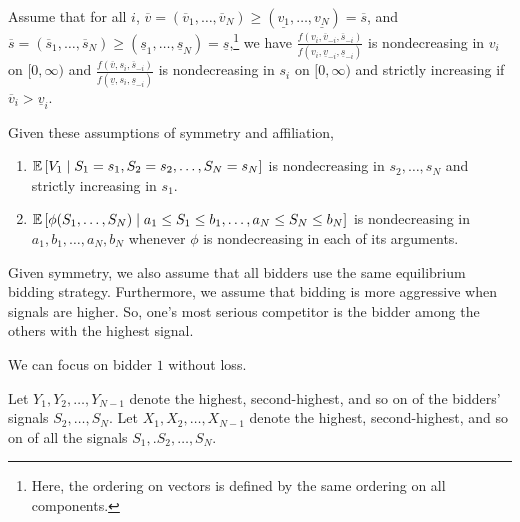 \begin{assumption}[Affiliation]
	Assume that for all $i$, $\overline{v} = \left( \overline{v}_1,\ldots,\overline{v}_N \right) \ge \left( \underline{v_1},\ldots,\underline{v_N} \right) = \overline{s}$, and $\overline{s} = \left( \overline{s}_1,\ldots,\overline{s}_N \right) \ge \left( \underline{s}_1,\ldots,\underline{s}_N \right) = \underline{s}$,\footnote{Here, the ordering on vectors is defined by the same ordering on all components.} we have $
	\frac{f\left( v_i, \overline{v}_{-i}, \overline{s}_{-i} \right)}{f\left( v_i, \underline{v}_{-i}, \underline{s}_{-i} \right)}$ is nondecreasing in $v_i$ on $[0,\infty)$ and $\frac{f(\overline{v}, s_i, \overline{s}_{-i})}{f(\underline{v}, s_{i}, \underline{s}_{-i})}$ is nondecreasing in $s_i$ on $[0,\infty)$ and strictly increasing if $\overline{v}_i > \underline{v}_i$.
\end{assumption}

\begin{proposition}	Given these assumptions of symmetry and affiliation,
		\begin{enumerate}[label=(\roman*)]
			\item $\mathbb{E}\left[V_1 \mid S_1=s_1,S_2= s_2, \ldots,S_N = s_N\right] $ is nondecreasing in $s_2,\ldots,s_N$ and strictly increasing in $s_1$.
			\item $\mathbb{E}\left[\phi(S_1,\ldots,S_N) \mid a_1 \le S_1 \le b_1,\ldots,a_N \le S_N \le b_N\right]$ is nondecreasing in $a_1,b_1,\ldots,a_N,b_N$ whenever $\phi$ is nondecreasing in each of its arguments.
		\end{enumerate}
	\end{proposition}

\begin{assumption}
	Given symmetry, we also assume that all bidders use the same equilibrium bidding strategy. Furthermore, we assume that bidding is more aggressive when signals are higher. So, one's most serious competitor is the bidder among the others with the highest signal.
\end{assumption}

\begin{notation}	We can focus on bidder $1$ without loss.

	Let $Y_1,Y_2,\ldots,Y_{N-1}$ denote the highest, second-highest, and so on of the bidders' signals $S_2,\ldots,S_N$.
	Let $X_1,X_2,\ldots,X_{N-1}$ denote the highest, second-highest, and so on of all the signals $S_1,.S_2,\ldots,S_N$.
\end{notation}

